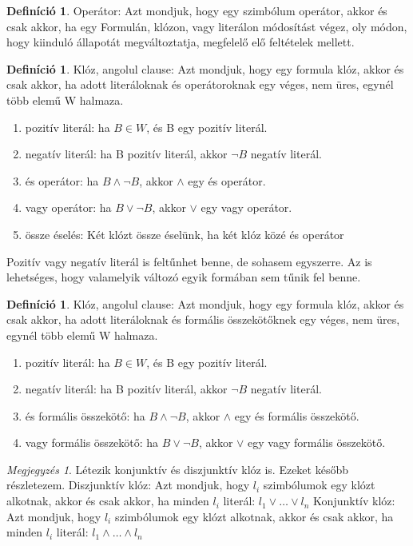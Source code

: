 \documentclass[
]{thesis-ekf}
\theoremstyle{definition}
\newtheorem{definicio}[tetel]{Definíció}
\theoremstyle{remark}
\newtheorem{megjegyzes}[tetel]{Megjegyzés}
\begin{document}
	\begin{definicio}
		Operátor: Azt mondjuk, hogy egy szimbólum operátor, akkor és csak akkor, ha egy Formulán, klózon, vagy literálon módosítást végez, oly módon, hogy kiinduló állapotát megváltoztatja, megfelelő elő feltételek mellett.
	\end{definicio}

	\begin{definicio}
		Klóz, angolul clause: Azt mondjuk, hogy egy formula klóz, akkor és csak akkor, ha adott literáloknak és operátoroknak egy véges, nem üres, egynél több elemű W halmaza.
		\begin{enumerate}
			\item pozitív literál: ha $ B\in W $, és B egy pozitív literál.
			\item negatív literál: ha B pozitív literál, akkor $\neg B $ negatív literál.
			\item és operátor: ha $ B \wedge \neg B $, akkor $\wedge$ egy és operátor.
			\item vagy operátor: ha $ B \vee \neg B $, akkor $\vee$ egy vagy operátor.
			\item össze éselés: Két klózt össze éselünk, ha két klóz közé és operátor
		\end{enumerate}
		Pozitív vagy negatív literál is feltűnhet benne, de sohasem egyszerre. Az is lehetséges, hogy valamelyik változó egyik formában sem tűnik fel benne.
	\end{definicio}

	\begin{definicio}
		Klóz, angolul clause: Azt mondjuk, hogy egy formula klóz, akkor és csak akkor, ha adott literáloknak és formális összekötőknek egy véges, nem üres, egynél több elemű W halmaza.
		\begin{enumerate}
			\item pozitív literál: ha $ B\in W $, és B egy pozitív literál.
			\item negatív literál: ha B pozitív literál, akkor $\neg B $ negatív literál.
			\item és formális összekötő: ha $ B \wedge \neg B $, akkor $\wedge$ egy és formális összekötő.
			\item vagy formális összekötő: ha $ B \vee \neg B $, akkor $\vee$ egy vagy formális összekötő.
		\end{enumerate}	
	\end{definicio}
	
	\begin{megjegyzes}
		Létezik konjunktív és diszjunktív klóz is. Ezeket később részletezem.
		Diszjunktív klóz: Azt mondjuk, hogy $ l_{i} $ szimbólumok egy klózt alkotnak, akkor és csak akkor, ha minden $ l_{i} $ literál: $ l_{1}\vee\dots\vee l_{n} $
		Konjunktív klóz: Azt mondjuk, hogy $ l_{i} $ szimbólumok egy klózt alkotnak, akkor és csak akkor, ha minden $ l_{i} $ literál: $ l_{1}\wedge\dots\wedge l_{n} $
	\end{megjegyzes}
\end{document}
